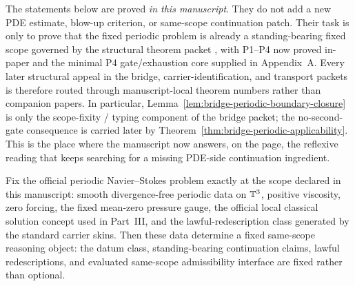 \begin{tcolorbox}[title={What this bridge packet does and does not do}, colback=blue!2!white, colframe=blue!55!black]
The statements below are proved \emph{in this manuscript}. They do not add a new PDE estimate, blow-up criterion, or same-scope continuation patch. Their task is only to prove that the fixed periodic problem is already a standing-bearing fixed scope governed by the structural theorem packet \StructuralPacketRef{}, with P1--P4 now proved in-paper and the minimal P4 gate/exhaustion core supplied in Appendix~A. Every later structural appeal in the bridge, carrier-identification, and transport packets is therefore routed through manuscript-local theorem numbers rather than companion papers. In particular, Lemma~\ref{lem:bridge-periodic-boundary-closure} is only the scope-fixity / typing component of the bridge packet; the no-second-gate consequence is carried later by Theorem~\ref{thm:bridge-periodic-applicability}. This is the place where the manuscript now answers, on the page, the reflexive reading that keeps searching for a missing PDE-side continuation ingredient.
\end{tcolorbox}

\begin{manuallemma}
\label{lem:bridge-fixed-periodic-scope}
Fix the official periodic Navier--Stokes problem exactly at the scope declared in this manuscript: smooth divergence-free periodic data on $\mathbb{T}^3$, positive viscosity, zero forcing, the fixed mean-zero pressure gauge, the official local classical solution concept used in Part~III, and the lawful-redescription class generated by the standard carrier skins. Then these data determine a fixed same-scope reasoning object: the datum class, standing-bearing continuation claims, lawful redescriptions, and evaluated same-scope admissibility interface are fixed rather than optional.
\end{manuallemma}

